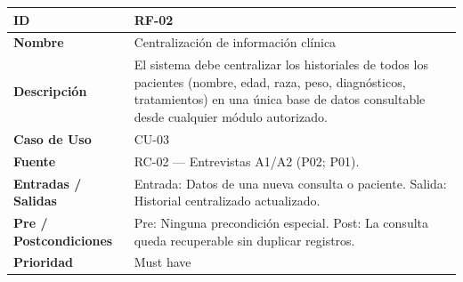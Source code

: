 \documentclass[
]{article}
\newcounter{none} %
\begin{document}
{\def\LTcaptype{none} %
\begin{longtable}[]{|
  >{\raggedright\arraybackslash}p{}|
  >{\raggedright\arraybackslash}p{}|}
\hline
\begin{minipage}[b]{\linewidth}\raggedright
\textbf{ID}
\end{minipage} & \begin{minipage}[b]{\linewidth}\raggedright
RF-02
\end{minipage} \\
\hline
\endhead
\hline
\endlastfoot
\textbf{Nombre} & \begin{minipage}[t]{\linewidth}\raggedright
Centralización de información clínica
\end{minipage} \\
\hline
\textbf{Descripción} & \begin{minipage}[t]{\linewidth}\raggedright
El sistema debe centralizar los historiales de todos los pacientes (nombre, edad, raza, peso, diagnósticos, tratamientos) en una única base de datos consultable desde cualquier módulo autorizado.
\end{minipage} \\
\hline
\textbf{Caso de Uso} & \begin{minipage}[t]{\linewidth}\raggedright
CU-03
\end{minipage} \\
\hline
\textbf{Fuente} & \begin{minipage}[t]{\linewidth}\raggedright
RC-02 — Entrevistas A1/A2 (P02; P01).
\end{minipage} \\
\hline
\textbf{Entradas / Salidas} & \begin{minipage}[t]{\linewidth}\raggedright
Entrada: Datos de una nueva consulta o paciente. Salida: Historial centralizado actualizado.
\end{minipage} \\
\hline
\textbf{Pre / Postcondiciones} & \begin{minipage}[t]{\linewidth}\raggedright
Pre: Ninguna precondición especial. Post: La consulta queda recuperable sin duplicar registros.
\end{minipage} \\
\hline
\textbf{Prioridad} & \begin{minipage}[t]{\linewidth}\raggedright
Must have
\end{minipage} \\

\end{longtable}}
\end{document}
